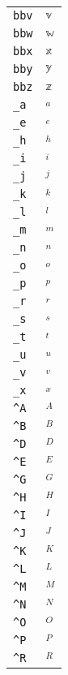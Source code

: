 \begin{longtable}{ll}
\texttt{bbv}&${}{\mathbb{v}}{}$\\
\texttt{bbw}&${}{\mathbb{w}}{}$\\
\texttt{bbx}&${}{\mathbb{x}}{}$\\
\texttt{bby}&${}{\mathbb{y}}{}$\\
\texttt{bbz}&${}{\mathbb{z}}{}$\\
\texttt{\_a}&${}_a{}$\\
\texttt{\_e}&${}_e{}$\\
\texttt{\_h}&${}_h{}$\\
\texttt{\_i}&${}_i{}$\\
\texttt{\_j}&${}_j{}$\\
\texttt{\_k}&${}_k{}$\\
\texttt{\_l}&${}_l{}$\\
\texttt{\_m}&${}_m{}$\\
\texttt{\_n}&${}_n{}$\\
\texttt{\_o}&${}_o{}$\\
\texttt{\_p}&${}_p{}$\\
\texttt{\_r}&${}_r{}$\\
\texttt{\_s}&${}_s{}$\\
\texttt{\_t}&${}_t{}$\\
\texttt{\_u}&${}_u{}$\\
\texttt{\_v}&${}_v{}$\\
\texttt{\_x}&${}_x{}$\\
\texttt{\textasciicircum A}&${}^A{}$\\
\texttt{\textasciicircum B}&${}^B{}$\\
\texttt{\textasciicircum D}&${}^D{}$\\
\texttt{\textasciicircum E}&${}^E{}$\\
\texttt{\textasciicircum G}&${}^G{}$\\
\texttt{\textasciicircum H}&${}^H{}$\\
\texttt{\textasciicircum I}&${}^I{}$\\
\texttt{\textasciicircum J}&${}^J{}$\\
\texttt{\textasciicircum K}&${}^K{}$\\
\texttt{\textasciicircum L}&${}^L{}$\\
\texttt{\textasciicircum M}&${}^M{}$\\
\texttt{\textasciicircum N}&${}^N{}$\\
\texttt{\textasciicircum O}&${}^O{}$\\
\texttt{\textasciicircum P}&${}^P{}$\\
\texttt{\textasciicircum R}&${}^R{}$\\

\end{longtable}
